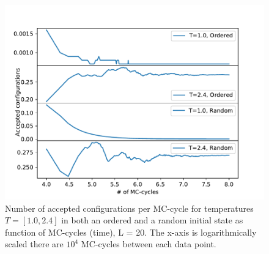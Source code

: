 \documentclass[12pt,english,a4paper]{article}
\begin{document}
\begin{figure}[H]
    \centering
    \includegraphics[scale=0.7]{Code_Files/Figures/Number_of_Accepted_Configs_L_20.pdf}
    \caption{Number of accepted configurations per MC-cycle for temperatures $T=[1.0,2.4]$ in both an ordered and a random initial state as function of MC-cycles (time), L = 20. The x-axis is logarithmically scaled there are $10^4$ MC-cycles between each data point.}
    \label{fig:acc_conf}
\end{figure}
\end{document}
